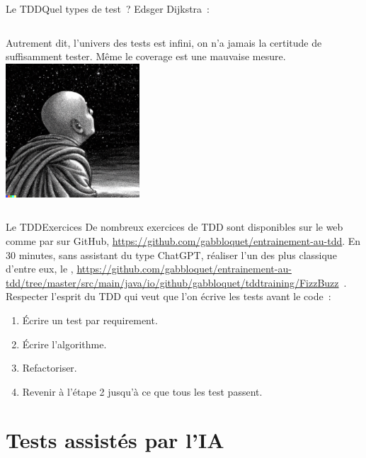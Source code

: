 \documentclass{beamer}
\begin{document}
    \begin{frame}{Le TDD}{Quel types de test~?}
        Edsger Dijkstra~: 
        \bigbreak
        \begin{columns}
            Autrement dit, l'univers des tests est infini, on n'a jamais la certitude de suffisamment tester.
            \bigbreak
            Même le coverage est une mauvaise mesure.
            \centering
            \includegraphics[width=5cm]{image/monk-looking-the-deepness-of-the-stars-in-the-night-sky}
        \end{columns}
    \end{frame}

    \begin{frame}{Le TDD}{Exercices \execcounterdispinc{}}
        De nombreux exercices de TDD sont disponibles sur le web comme par sur GitHub, \url{https://github.com/gabbloquet/entrainement-au-tdd}.
        \bigbreak
        En 30 minutes, sans assistant du type ChatGPT, réaliser l'un des plus classique d'entre eux, le , \url{https://github.com/gabbloquet/entrainement-au-tdd/tree/master/src/main/java/io/github/gabbloquet/tddtraining/FizzBuzz}~.
        Respecter l'esprit du TDD qui veut que l'on écrive les tests avant le code~:
        \begin{enumerate}
            \item Écrire un test par requirement.
            \item Écrire l'algorithme.
            \item Refactoriser.
            \item Revenir à l'étape 2 jusqu'à ce que tous les test passent.
        \end{enumerate}
    \end{frame}


    \section{Tests assistés par l'IA}\label{sec:tests-assistes-par-ia}
\end{document}
